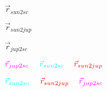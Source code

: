 \documentclass{article}
\begin{document}
\color{cyan}
\begin{center}\huge{
	$\vec{r}_{sun2sc}$
}\end{center}

\color{red}
\begin{center}\huge{
	$\vec{r}_{sun2jup}$
}\end{center}

\color{magenta}
\begin{center}\huge{
	$\vec{r}_{jup2sc}$
}\end{center}


\begin{center}\huge{
$
	\color{magenta} \vec{r}_{jup2sc}
	\color{white}   =
	\color{cyan}    \vec{r}_{sun2sc}
	\color{white}   -
	\color{red}     \vec{r}_{sun2jup}
$
}\end{center}

\begin{center}\huge{
$
	\color{cyan}    \vec{r}_{sun2sc}
	\color{white}   =
	\color{red}     \vec{r}_{sun2jup}
	\color{white}   +
	\color{magenta} \vec{r}_{jup2sc}
$
}\end{center}
\end{document}
